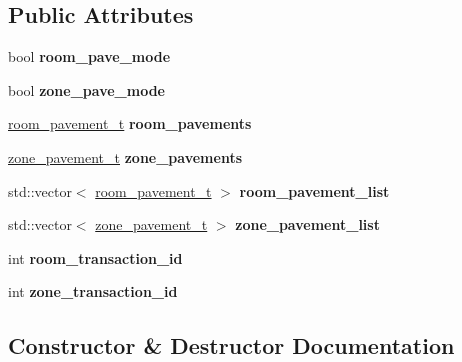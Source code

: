 \subsection*{Public Attributes}
\begin{DoxyCompactItemize}
\item 
\mbox{\label{structbuilder__data__t_a6e94b87674eb76c6212104429801961e}} 
bool {\bfseries room\+\_\+pave\+\_\+mode}
\item 
\mbox{\label{structbuilder__data__t_a1cd44669d8e71ed62e2436928310b2b1}} 
bool {\bfseries zone\+\_\+pave\+\_\+mode}
\item 
\mbox{\label{structbuilder__data__t_ad8e3c4db1a9b71b32dcb7d29bffab63c}} 
\hyperlink{structroom__pavement__t}{room\+\_\+pavement\+\_\+t} {\bfseries room\+\_\+pavements}
\item 
\mbox{\label{structbuilder__data__t_a7d2e8f8f277f9cd36c38d637675fe6ae}} 
\hyperlink{structzone__pavement__t}{zone\+\_\+pavement\+\_\+t} {\bfseries zone\+\_\+pavements}
\item 
\mbox{\label{structbuilder__data__t_ad4bdd03a13876fac8ced64b48f57c8cd}} 
std\+::vector$<$ \hyperlink{structroom__pavement__t}{room\+\_\+pavement\+\_\+t} $>$ {\bfseries room\+\_\+pavement\+\_\+list}
\item 
\mbox{\label{structbuilder__data__t_af897ad39acce126074a4121cdccbfbb9}} 
std\+::vector$<$ \hyperlink{structzone__pavement__t}{zone\+\_\+pavement\+\_\+t} $>$ {\bfseries zone\+\_\+pavement\+\_\+list}
\item 
\mbox{\label{structbuilder__data__t_a2cf2d3faf04c8ed297669a191792524e}} 
int {\bfseries room\+\_\+transaction\+\_\+id}
\item 
\mbox{\label{structbuilder__data__t_af72d9ad9893d02d243f6d4d64a6c9253}} 
int {\bfseries zone\+\_\+transaction\+\_\+id}
\end{DoxyCompactItemize}


\subsection{Constructor \& Destructor Documentation}
\mbox{\label{structbuilder__data__t_aa081bbc82b8007a5f62b7540822dcba3}} 

